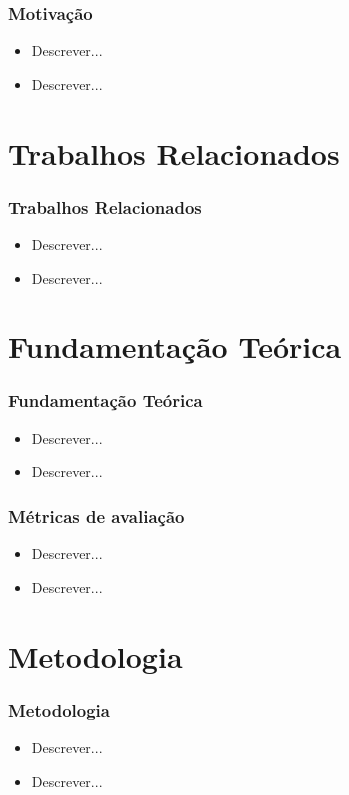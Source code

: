 \documentclass[aspectratio=34, 14pt]{latex-slides}
\begin{document}
    \begin{frame}
        \frametitle{Motivação}

        \begin{itemize}
            \item Descrever...
            \item Descrever...
        \end{itemize}
    \end{frame}

    \section{Trabalhos Relacionados}
    \begin{frame}
        \frametitle{Trabalhos Relacionados}

        \begin{itemize}
            \item Descrever...
            \item Descrever...
        \end{itemize}
    \end{frame}

    \section{Fundamentação Teórica}
    \begin{frame}
        \frametitle{Fundamentação Teórica}

        \begin{itemize}
            \item Descrever...
            \item Descrever...
        \end{itemize}
    \end{frame}

    \begin{frame}
        \frametitle{Métricas de avaliação}

        \begin{itemize}
            \item Descrever...
            \item Descrever...
        \end{itemize}
    \end{frame}

    \section{Metodologia}
    \begin{frame}
        \frametitle{Metodologia}

        \begin{itemize}
            \item Descrever...
            \item Descrever...
        \end{itemize}
    \end{frame}
\end{document}
